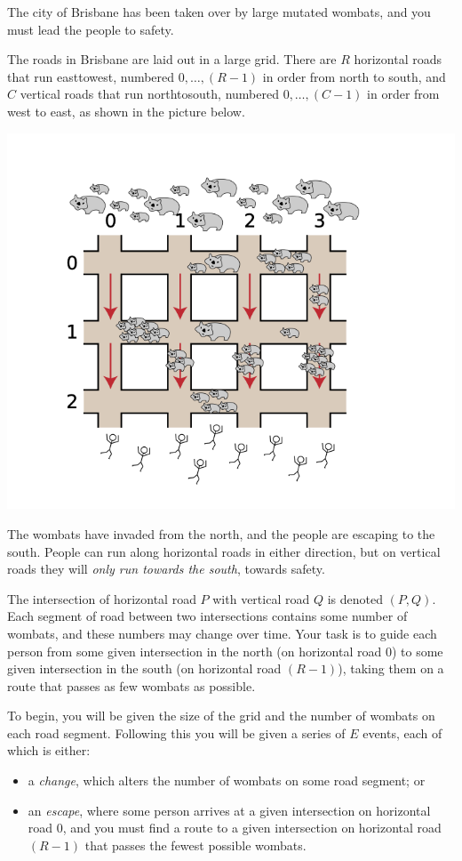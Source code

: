 The city of Brisbane has been taken over by large mutated wombats, and you must lead the people to safety.

The roads in Brisbane are laid out in a large grid. There are $R$ horizontal roads that run east­to­west, numbered $0, \dots, (R ­- 1)$ in order from north to south, and $C$ vertical roads that run north­to­south, numbered $0, \dots, (C ­- 1)$ in order from west to east, as shown in the picture below.

\includegraphics{wombats1.png}

The wombats have invaded from the north, and the people are escaping to the south. People can run along horizontal roads in either direction, but on vertical roads they will \textit{only run towards the south}, towards safety.

The intersection of horizontal road $P$ with vertical road $Q$ is denoted $(P, Q)$. Each segment of road between two intersections contains some number of wombats, and these numbers may change over time. Your task is to guide each person from some given intersection in the north (on horizontal road $0$) to some given intersection in the south (on horizontal road $(R ­- 1)$), taking them on a route that passes as few wombats as possible.

To begin, you will be given the size of the grid and the number of wombats on each road segment. Following this you will be given a series of $E$ events, each of which is either:
                      
\begin{itemize}
\item a \textit{change}, which alters the number of wombats on some road segment; or
\item an \textit{escape}, where some person arrives at a given intersection on horizontal road $0$, and you must find a route to a given intersection on horizontal road $(R -­ 1)$ that passes the fewest possible wombats.
\end{itemize}

